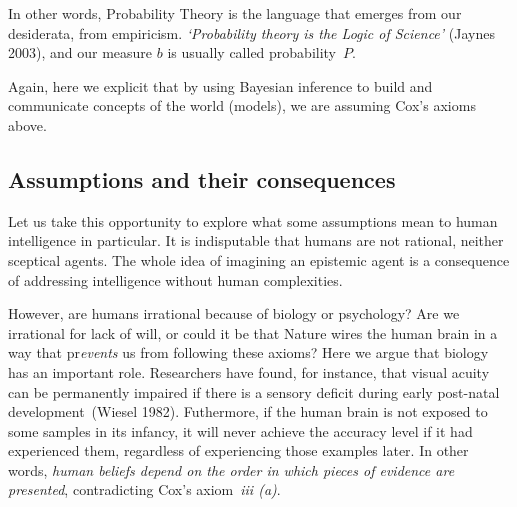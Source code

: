 \documentclass[
  letterpaper,
  12pt,
  british]{tufte-book}
\theoremstyle{plain}
\theoremstyle{plain}
\theoremstyle{definition}
\theoremstyle{remark}
\begin{document}
In other words, Probability Theory is the language that emerges from our
desiderata, from empiricism. \emph{`Probability theory is the Logic of
Science'} (Jaynes
2003),
and our measure \(b\) is usually called probability~\(P\).

Again, here we explicit that by using Bayesian inference to build and
communicate concepts of the world (models), we are assuming Cox's axioms
above.

\hypertarget{assumptions-and-their-consequences}{%
\subsection{Assumptions and their
consequences}\label{assumptions-and-their-consequences}}

Let us take this opportunity to explore what some assumptions mean to
human intelligence in particular. It is indisputable that humans are not rational, neither sceptical
agents. The whole idea of imagining an epistemic agent is a consequence
of addressing intelligence without human complexities.

However, are humans irrational because of biology or psychology? Are we
irrational for lack of will, or could it be that Nature wires the human
brain in a way that pr\emph{events} us from following these axioms? Here
we argue that biology has an important role. Researchers have found, for
instance, that visual acuity can be permanently impaired if there is a
sensory deficit during early post-natal development~(Wiesel
1982).
Futhermore, if the human brain is not exposed to some samples in its
infancy, it will never achieve the accuracy level if it had experienced
them, regardless of experiencing those examples later. In other words,
\emph{human beliefs depend on the order in which pieces of evidence are
presented}, contradicting Cox's axiom~\emph{iii (a)}.
\end{document}
